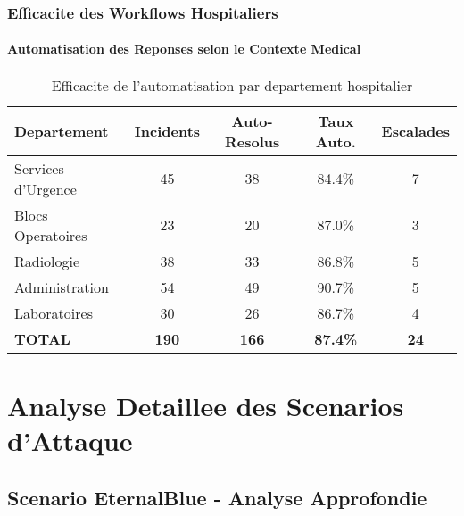 \subsubsection{Efficacite des Workflows Hospitaliers}

\paragraph{Automatisation des Reponses selon le Contexte Medical}

\begin{table}[H]
    \centering
    \caption{Efficacite de l'automatisation par departement hospitalier}
    \begin{tabular}{|l|c|c|c|c|}
        \hline
        \textbf{Departement} & \textbf{Incidents} & \textbf{Auto-Resolus} & \textbf{Taux Auto.} & \textbf{Escalades} \\
        \hline
        Services d'Urgence   & 45                 & 38                    & 84.4\%              & 7                  \\
        \hline
        Blocs Operatoires    & 23                 & 20                    & 87.0\%              & 3                  \\
        \hline
        Radiologie           & 38                 & 33                    & 86.8\%              & 5                  \\
        \hline
        Administration       & 54                 & 49                    & 90.7\%              & 5                  \\
        \hline
        Laboratoires         & 30                 & 26                    & 86.7\%              & 4                  \\
        \hline
        \textbf{TOTAL}       & \textbf{190}       & \textbf{166}          & \textbf{87.4\%}     & \textbf{24}        \\
        \hline
    \end{tabular}
\end{table}

\section{Analyse Detaillee des Scenarios d'Attaque}

\subsection{Scenario EternalBlue - Analyse Approfondie}

